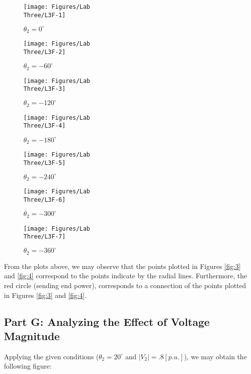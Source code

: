 \documentclass[
	letterpaper, %
	10pt, %
]{CSUniSchoolLabReport}
\begin{document}
\begin{figure}[H]
  \centering
  \texttt{[image: Figures/Lab\\ Three/L3F-1]}
  \caption{$\theta_2=0^{\circ}$}
  \label{fig:5}
\end{figure}

\begin{figure}[H]
  \centering
  \texttt{[image: Figures/Lab\\ Three/L3F-2]}
  \caption{$\theta_2=-60^{\circ}$}
  \label{fig:6}
\end{figure}

\begin{figure}[H]
  \centering
  \texttt{[image: Figures/Lab\\ Three/L3F-3]}
  \caption{$\theta_2=-120^{\circ}$}
  \label{fig:7}
\end{figure}

\begin{figure}[H]
  \centering
  \texttt{[image: Figures/Lab\\ Three/L3F-4]}
  \caption{$\theta_2=-180^{\circ}$}
  \label{fig:8}
\end{figure}

\begin{figure}[H]
  \centering
  \texttt{[image: Figures/Lab\\ Three/L3F-5]}
  \caption{$\theta_2=-240^{\circ}$}
  \label{fig.65}
\end{figure}

\begin{figure}[H]
  \centering
  \texttt{[image: Figures/Lab\\ Three/L3F-6]}
  \caption{$\theta_2=-300^{\circ}$}
  \label{fig:10}
\end{figure}

\begin{figure}[H]
  \centering
  \texttt{[image: Figures/Lab\\ Three/L3F-7]}
  \caption{$\theta_2=-360^{\circ}$}
  \label{fig:11}
\end{figure}

From the plots above, we may observe that the points plotted in Figures \ref{fig:3} and \ref{fig:4} correspond to the points indicate by the radial lines. Furthermore, the red circle (sending end power), corresponds to a connection of the points plotted in Figures \ref{fig:3} and \ref{fig:4}.

\subsection{Part G: Analyzing the Effect of Voltage Magnitude}

Applying the given conditions ($\theta_2=20^{\circ}$ and $|V_2|=.8[p.u.]$), we may obtain the following figure:
\end{document}
